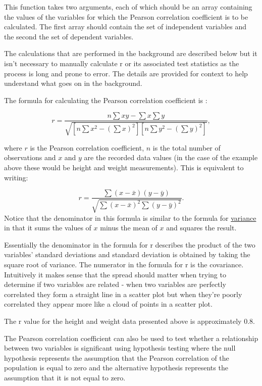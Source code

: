 \documentclass[
]{book}
\begin{document}
This function takes two arguments, each of which should be an array containing the values of the variables for which the Pearson correlation coefficient is to be calculated. The first array should contain the set of independent variables and the second the set of dependent variables.

The calculations that are performed in the background are described below but it isn't necessary to manually calculate r or its associated test statistics as the process is long and prone to error. The details are provided for context to help understand what goes on in the background.

The formula for calculating the Pearson correlation coefficient is \citep{swinscow2}:

\[r = \frac{n \sum{xy}-\sum{x} \sum{y}}{\sqrt{[n \sum{x^2}-(\sum{x})^2][n \sum{y^2}-(\sum{y})^2]}}, \]

where \(r\) is the Pearson correlation coefficient, \(n\) is the total number of observations and \(x\) and \(y\) are the recorded data values (in the case of the example above these would be height and weight measurements). This is equivalent to writing:

\[r=\frac{\sum{(x-\bar{x})(y-\bar{y})}}{\sqrt{\sum{(x-\bar{x})^2}\sum{(y-\bar{y})^2}}}.\]
Notice that the denominator in this formula is similar to the formula for \protect\hyperlink{varr}{variance} in that it sums the values of \(x\) minus the mean of \(x\) and squares the result.

Essentially the denominator in the formula for r describes the product of the two variables' standard deviations and standard deviation is obtained by taking the square root of variance. The numerator in the formula for r is the covariance. Intuitively it makes sense that the spread should matter when trying to determine if two variables are related - when two variables are perfectly correlated they form a straight line in a scatter plot but when they're poorly correlated they appear more like a cloud of points in a scatter plot.

The r value for the height and weight data presented above is approximately 0.8.

The Pearson correlation coefficient can also be used to test whether a relationship between two variables is significant using hypothesis testing where the null hypothesis represents the assumption that the Pearson correlation of the population is equal to zero and the alternative hypothesis represents the assumption that it is not equal to zero.
\end{document}
